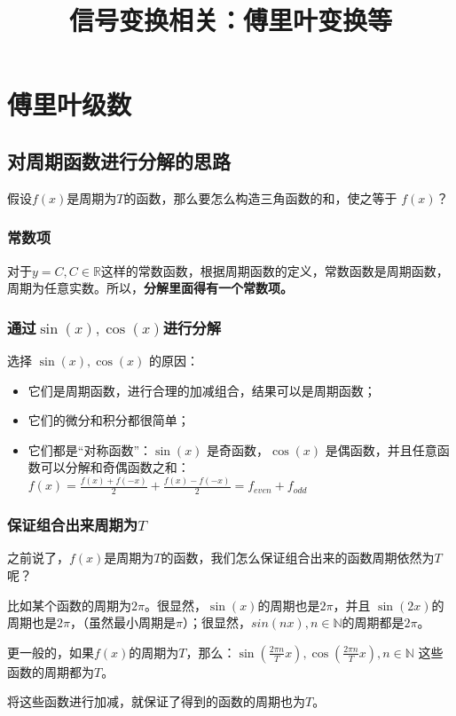 \documentclass[12pt]{article}
\title{信号变换相关：傅里叶变换等}
\begin{document}
\maketitle

\section{傅里叶级数\cite{Understand_Fourier_Series_Ma}}
\subsection{对周期函数进行分解的思路}
假设$f(x)$是周期为$T$的函数，那么要怎么构造三角函数的和，使之等于 $f(x)$？
\subsubsection{常数项}
对于$y=C,C\in\mathbb{R}$这样的常数函数，根据周期函数的定义，常数函数是周期函数，周期为任意实数。所以，\textbf{分解里面得有一个常数项。}

\subsubsection{通过$\sin(x),\cos(x)$进行分解}
选择 $\sin(x),\cos(x)$ 的原因：
\begin{itemize}
    \item 它们是周期函数，进行合理的加减组合，结果可以是周期函数；
    \item 它们的微分和积分都很简单；
    \item 它们都是“对称函数”：$\sin(x)$ 是奇函数，$\cos(x)$ 是偶函数，并且任意函数可以分解和奇偶函数之和：$f(x) = \frac{f(x)+f(-x)}{2} + \frac{f(x)-f(-x)}{2} = f_{even} + f_{odd}$ 
\end{itemize}

\subsubsection{保证组合出来周期为$T$}
之前说了，$f(x)$是周期为$T$的函数，我们怎么保证组合出来的函数周期依然为$T$呢？

比如某个函数的周期为$2\pi$。很显然，$\sin(x)$的周期也是$2\pi$，并且 $\sin(2x)$的周期也是$2\pi$，（虽然最小周期是$\pi$）；很显然，$sin(nx),n\in\mathbb{N}$的周期都是$2\pi$。

更一般的，如果$f(x)$的周期为$T$，那么：$\sin(\frac{2\pi n}{T}x), \cos(\frac{2\pi n}{T}x), n\in\mathbb{N}$ 这些函数的周期都为$T$。

将这些函数进行加减，就保证了得到的函数的周期也为$T$。
\end{document}
